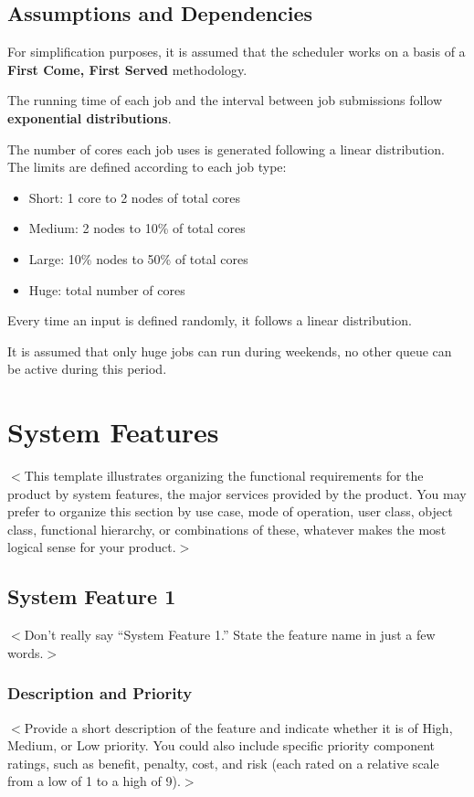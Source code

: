 \documentclass{scrreprt}
\begin{document}
\section{Assumptions and Dependencies}

\par For simplification purposes, it is assumed that the scheduler works on a basis of a \textbf{First Come, First Served} methodology. 
\par The running time of each job and the interval between job submissions follow \textbf{exponential distributions}.
\par The number of cores each job uses is generated following a linear distribution. The limits are defined according to each job type:
\begin{itemize}
\item Short: 1 core to 2 nodes of total cores
\item Medium: 2 nodes to 10\% of total cores
\item Large: 10\% nodes to 50\% of total cores
\item Huge: total number of cores
\end{itemize}
\par Every time an input is defined randomly, it follows a linear distribution.
\par It is assumed that only huge jobs can run during weekends, no other queue can be active during this period.


\chapter{System Features}
$<$This template illustrates organizing the functional requirements for the 
product by system features, the major services provided by the product. You may 
prefer to organize this section by use case, mode of operation, user class, 
object class, functional hierarchy, or combinations of these, whatever makes the 
most logical sense for your product.$>$

\section{System Feature 1}
$<$Don’t really say “System Feature 1.” State the feature name in just a few 
words.$>$

\subsection{Description and Priority}
$<$Provide a short description of the feature and indicate whether it is of 
High, Medium, or Low priority. You could also include specific priority 
component ratings, such as benefit, penalty, cost, and risk (each rated on a 
relative scale from a low of 1 to a high of 9).$>$
\end{document}
